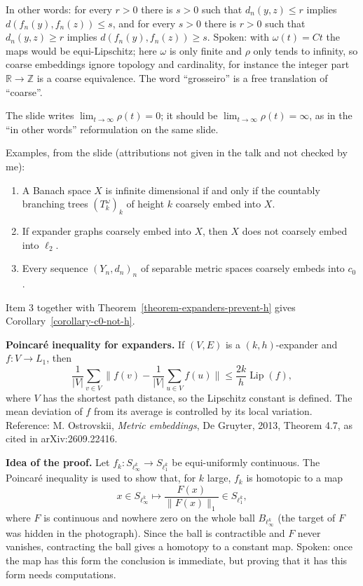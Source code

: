 \noindent
In other words: for every $r > 0$ there is
$s > 0$ such that $d_n(y,z) \le r$ implies
$d(f_n(y),f_n(z)) \le s$, and for every
$s > 0$ there is $r > 0$ such that
$d_n(y,z) \ge r$ implies
$d(f_n(y),f_n(z)) \ge s$. Spoken: with
$\omega(t) = Ct$ the maps would be
equi-Lipschitz; here $\omega$ is only finite
and $\rho$ only tends to infinity, so coarse
embeddings ignore topology and cardinality,
for instance the integer part
$\mathbb{R} \to \mathbb{Z}$ is a coarse
equivalence. The word ``grosseiro'' is a free
translation of ``coarse''.

\begin{remark}
\label{remark-coarse-slide-typo}
The slide writes
$\lim_{t\to\infty} \rho(t) = 0$; it should be
$\lim_{t\to\infty} \rho(t) = \infty$, as in
the ``in other words'' reformulation on the
same slide.
\end{remark}

\noindent
Examples, from the slide (attributions not
given in the talk and not checked by me):
\begin{enumerate}
\item A Banach space $X$ is infinite
dimensional if and only if the countably
branching trees $(T_k^\omega)_k$ of height
$k$ coarsely embed into $X$.
\item If expander graphs coarsely embed into
$X$, then $X$ does not coarsely embed into
$\ell_2$.
\item Every sequence $(Y_n,d_n)_n$ of
separable metric spaces coarsely embeds into
$c_0$.
\end{enumerate}
Item 3 together with
Theorem~\ref{theorem-expanders-prevent-h}
gives Corollary~\ref{corollary-c0-not-h}.

\medskip\noindent
{\bf Poincar\'e inequality for expanders.} If
$(V,E)$ is a $(k,h)$-expander and
$f : V \to L_1$, then
$$
\frac{1}{|V|}\sum_{v \in V}
\Big\|f(v) - \frac{1}{|V|}
\sum_{u \in V} f(u)\Big\|
\le \frac{2k}{h}\operatorname{Lip}(f),
$$
where $V$ has the shortest path distance, so
the Lipschitz constant is defined. The mean
deviation of $f$ from its average is
controlled by its local variation. Reference:
M. Ostrovskii, \emph{Metric embeddings}, De
Gruyter, 2013, Theorem 4.7, as cited in
arXiv:2609.22416.

\medskip\noindent
{\bf Idea of the proof.} Let
$f_k : S_{\ell_\infty^k} \to S_{\ell_1^k}$ be
equi-uniformly continuous. The Poincaré
inequality is used to show that, for $k$
large, $f_k$ is homotopic to a map
$$
x \in S_{\ell_\infty^k}
\mapsto \frac{F(x)}{\|F(x)\|_1}
\in S_{\ell_1^k},
$$
where $F$ is continuous and nowhere zero on
the whole ball $B_{\ell_\infty^k}$ (the
target of $F$ was hidden in the photograph).
Since the ball is contractible and $F$ never
vanishes, contracting the ball gives a
homotopy to a constant map. Spoken: once the
map has this form the conclusion is
immediate, but proving that it has this form
needs computations.

